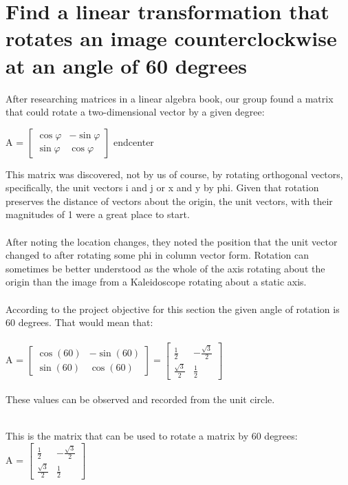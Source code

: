 \section{\LARGE Find a linear transformation that rotates an image counterclockwise at an  angle of 60 degrees}
 After researching matrices in a linear algebra book, our group found a matrix that could rotate a two-dimensional vector by a given degree:

 \begin{center}
     A = $\left[\begin{array}{cc}
\cos\varphi & -\sin\varphi \\ \sin\varphi & \cos\varphi \end{array}\right]$ end{center}
\end{center}
This matrix was discovered, not by us of course, by rotating orthogonal vectors, specifically, the unit vectors i and j or x and y by phi. Given that rotation preserves the distance of vectors about the origin, the unit vectors, with their magnitudes of 1 were a great place to start.
\\\\After noting the location changes, they noted the position that the unit vector changed to after rotating some phi in column vector form. Rotation can sometimes be better understood as the whole of the axis rotating about the origin than the image from a Kaleidoscope rotating about a static axis.
\\\\According to the project objective for this section the given angle of rotation is 60 degrees. That would mean that:\\\\A =  $\left[\begin{array}{cc}
\cos(60) & -\sin(60) \\ \sin(60) & \cos(60) \end{array}\right] = \left[\begin{array}{cc}
\frac{1}{2} & -\frac{\sqrt{3}}{2} \\\frac{\sqrt{3}}{2}  & \frac{1}{2}\end{array}\right]$\\
\\These values can be observed and recorded from the unit circle. \\\\
\begin{center}
    This is the matrix that can be used to rotate a matrix by 60 degrees:\\A = $\left[\begin{array}{cc}
\frac{1}{2} & -\frac{\sqrt{3}}{2} \\\frac{\sqrt{3}}{2}  & \frac{1}{2}\end{array}\right]$
\newpage
\end{center}

